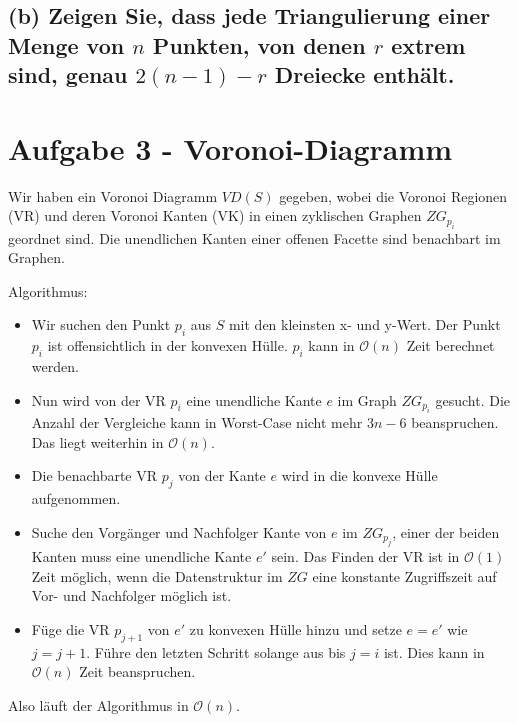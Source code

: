 \documentclass[a4paper]{article}
\begin{document}
\subsection*{(b) Zeigen Sie, dass jede Triangulierung einer Menge von $n$ Punkten, von denen $r$ extrem sind, genau $2 (n - 1) - r$ Dreiecke enthält.}



\section*{Aufgabe 3 - Voronoi-Diagramm}


Wir haben ein Voronoi Diagramm $VD(S)$ gegeben, wobei die Voronoi Regionen (VR) und deren Voronoi Kanten (VK) in einen zyklischen Graphen $ZG_{p_i}$ geordnet sind. Die unendlichen Kanten einer offenen Facette sind benachbart im Graphen. 

Algorithmus:

\begin{itemize}

\item Wir suchen den Punkt $p_i$ aus $S$ mit den kleinsten x- und y-Wert. Der Punkt $p_i$ ist offensichtlich in der konvexen Hülle. $p_i$ kann in $\mathcal{O}(n)$ Zeit berechnet werden.

\item Nun wird von der VR $p_i$ eine unendliche Kante $e$ im Graph $ZG_{p_i}$ gesucht. Die Anzahl der Vergleiche kann in Worst-Case nicht mehr $3 n-6$ beanspruchen. Das liegt weiterhin in $\mathcal{O}(n)$.

\item Die benachbarte VR $p_j$ von der Kante $e$ wird in die konvexe Hülle aufgenommen.

\item Suche den Vorgänger und Nachfolger Kante von $e$ im $ZG_{p_j}$, einer der beiden Kanten muss eine unendliche Kante $e'$ sein. Das Finden der VR ist in $\mathcal{O}(1)$ Zeit möglich, wenn die Datenstruktur im $ZG$ eine konstante Zugriffszeit auf Vor- und Nachfolger möglich ist. 

\item Füge die VR $p_{j+1}$ von $e'$ zu konvexen Hülle hinzu und setze $e = e'$ wie $j=j+1$. Führe den letzten Schritt solange aus bis $j=i$ ist. Dies kann in $\mathcal{O}(n)$ Zeit beanspruchen.

\end{itemize}

Also läuft der Algorithmus in $\mathcal{O}(n)$.
\end{document}
